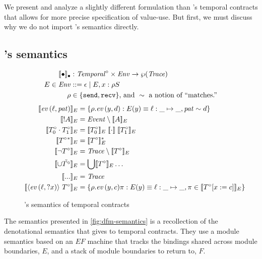 We present and analyze a slightly different formulation than \dfm's temporal contracts that allows for more precise specification of value-use.
%
But first, we must discuss why we do not import \dfm's semantics directly.
%
\subsection{\dfm's semantics}
\newcommand{\denotedfm}[2]{\denote{#1}_{#2}}
\begin{figure}
  \begin{align*}
    \denotedfm{\bullet}{\bullet} &: \TContract^\circ \times \Env \to \wp(\mathit{Trace})
    \\
    E \in \Env &::= \epsilon \alt E, \mvar : \rho \mscon
    \\
    \rho &\in \setof{{\tt send}, {\tt recv}} \text{, and }\sim \text{ a notion of ``matches.''}
  \end{align*}
  \begin{align*}
    \denotedfm{\scevdfm{\mtoplevelname}{\mvpat}}{E} &=
      \setbuild{\rho.\scevdfm{y}{d}}{E(y) \equiv \sarr{\mtoplevelname}{\_}{\_}, \mvpat \sim d}
    \\
    \denotedfm{\snonevent{\mevent}}{E} &= \Event \setminus \denotedfm{\mevent}{E}
    \\
    \denotedfm{\stseq{\motcon_0}{\motcon_1}}{E} &= \denotedfm{\motcon_0}{E} \semseq \denotedfm{\motcon_1}{E}
    \\
    \denotedfm{\stmany{\motcon{}}}{E} &= \stmany{\denotedfm{\motcon}{E}}
    \\
    \denotedfm{\stnot{\motcon}}{E} &= \mathit{Trace} \setminus \denotedfm{\motcon}{E}
    \\
    \denotedfm{\stOr{\isset{\motcon}}}{E} &= \bigcup\denotedfm{\motcon}{E}\ldots
    \\
    \denotedfm{\sddd}{E} &= \mathit{Trace}
    \\
    \denotedfm{\stbind{\scevdfm{\mtoplevelname}{? \mvar}}{\motcon}}{E} &= \setbuild{\rho.\scevdfm{y}{c}\mtrace}{E(y) \equiv \sarr{\mtoplevelname}{\_}{\_}, \mtrace \in \denotedfm{\motcon[\mvar := c]}{E}}
  \end{align*}
  \caption{\dfm's semantics of temporal contracts}
  \label{fig:dfm-semantics}
\end{figure}
%
The semantics presented in \autoref{fig:dfm-semantics} is a recollection of the denotational semantics that \dfm{} gives to temporal contracts.
%
They use a module semantics based on an $\mathit{EF}$ machine that tracks the bindings shared across module boundaries, $E$, and a stack of module boundaries to return to, $F$.
